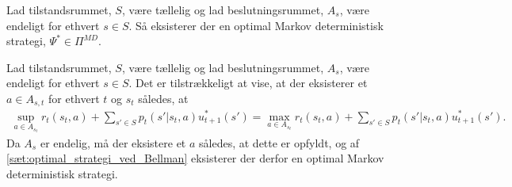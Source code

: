 \begin{minipage}\textwidth
\begin{pro} \textbf{}\label{prop:markov_det_strategi} %
\newline
Lad tilstandsrummet, $S$, være tællelig og lad beslutningsrummet, $A_s$, være endeligt for ethvert $s\in S$. Så eksisterer der en optimal Markov deterministisk strategi, $\Psi^*\in \Pi^{MD}$.  
\end{pro}
\end{minipage}
\begin{bev} \textbf{} %
\newline
Lad tilstandsrummet, $S$, være tællelig og lad beslutningsrummet, $A_s$, være endeligt for ethvert $s\in S$.
Det er tilstrækkeligt at vise, at der eksisterer et $a\in A_{s,t}$ for ethvert $t$ og $s_t$ således, at
\begin{align*}
    \sup_{a\in A_{s_t}} r_t(s_t,a) + \sum_{s'\in S}p_t\left(s' | s_t, a\right)u^*_{t+1}(s')
    = \max_{a\in A_{s_t}} r_t(s_t,a) + \sum_{s'\in S}p_t\left(s' | s_t, a\right)u^*_{t+1}(s').
\end{align*}
Da $A_s$ er endelig, må der eksistere et $a$ således, at dette er opfyldt, og af \autoref{sæt:optimal_strategi_ved_Bellman} eksisterer der derfor en optimal Markov deterministisk strategi.
\end{bev}

